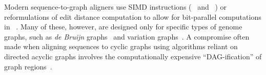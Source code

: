 Modern sequence-to-graph aligners use SIMD instructions
(\vg~\cite{garrison_variation_2018} and \pasgal~\cite{jain_accelerating_2019})
or reformulations of edit distance computation to allow for bit-parallel
computations in \graphaligner~\cite{rautiainen_bitparallel_2019}. Many of these,
however, are designed only for specific types of genome graphs, such as
{\itshape de Bruijn} graphs~\cite{liu_debga_2016,limasset2019toward} and
variation graphs~\cite{garrison_variation_2018}. A compromise often made when
aligning sequences to cyclic graphs using algorithms reliant on directed acyclic
graphs involves the computationally expensive ``DAG-ification'' of graph
regions~\cite{kavya_sequence_2019,garrison_variation_2018}.


